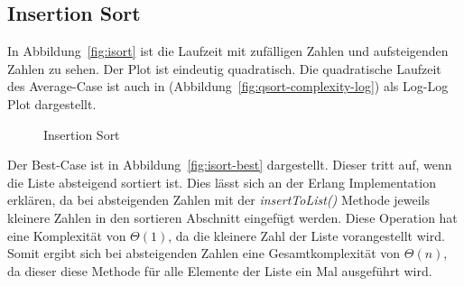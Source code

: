 
\subsection{Insertion Sort}\label{subsec:insertion-sort-laufzeit}

In Abbildung~\ref{fig:isort} ist die Laufzeit mit zufälligen Zahlen und
aufsteigenden Zahlen zu sehen.
Der Plot ist eindeutig quadratisch.%
Die quadratische Laufzeit des Average-Case ist auch in
(Abbildung~\ref{fig:qsort-complexity-log}) als Log-Log Plot dargestellt.
\begin{figure}[hbt]
    \centering
    \caption{Insertion Sort}
    \hfill
\end{figure}

Der Best-Case ist in Abbildung~\ref{fig:isort-best} dargestellt.
Dieser tritt auf, wenn die Liste absteigend sortiert ist.
Dies lässt sich an der Erlang Implementation erklären, da bei absteigenden
Zahlen mit der \textit{insertToList()} Methode jeweils kleinere Zahlen in den
sortieren Abschnitt eingefügt werden.
Diese Operation hat eine Komplexität von \(\Theta(1)\), da die kleinere Zahl
der Liste vorangestellt wird.
Somit ergibt sich bei absteigenden Zahlen eine Gesamtkomplexität von
\(\Theta(n)\), da dieser diese Methode für alle Elemente der Liste ein Mal
ausgeführt wird.


